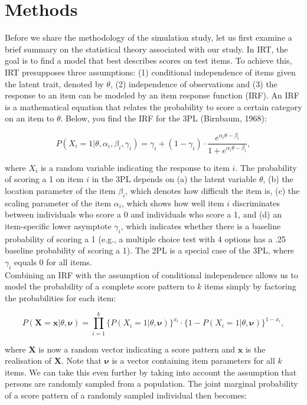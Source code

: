 \documentclass[Royal,sageapa,times,doublespace]{sagej}
\begin{document}
\section{Methods}
Before we share the methodology of the simulation study, let us first examine a brief summary on the statistical theory associated with our study. In IRT, the goal is to find a model that best describes scores on test items. To achieve this, IRT presupposes three assumptions: (1) conditional independence of items given the latent trait, denoted by $\theta$, (2) independence of observations and (3) the response to an item can be modeled by an item response function (IRF). An IRF is a mathematical equation that relates the probability to score a certain category on an item to $\theta$. Below, you find the IRF for the 3PL (Birnbaum, 1968):

\begin{equation}
P(X_i = 1 | \theta, \alpha_{i}, \beta_{i}, \gamma_{i}) = \gamma_{i} + (1 - \gamma_{i}) \cdot 
\frac{e^{\alpha_{i}\theta - \beta_{i}}}{1 + e^{\alpha_{i}\theta - \beta_{i}}},
\end{equation}

where $X_i$ is a random variable indicating the response to item $i$. The probability of scoring a 1 on item $i$ in the 3PL depends on (a) the latent variable $\theta$, (b) the location parameter of the item $\beta_{i}$, which denotes how difficult the item is, (c) the scaling parameter of the item $\alpha_{i}$, which shows how well item $i$ discriminates between individuals who score a 0 and individuals who score a 1, and (d) an item-specific lower asymptote $\gamma_{i}$, which indicates whether there is a baseline probability of scoring a 1 (e.g., a multiple choice test with 4 options has a .25 baseline probability of scoring a 1). The 2PL is a special case of the 3PL, where $\gamma_{i}$ equals 0 for all items. \\
\indent Combining an IRF with the assumption of conditional independence allows us to model the probability of a complete score pattern to $k$ items simply by factoring the probabilities for each item:

\begin{equation}
P(\boldsymbol{X} = \boldsymbol{x} | \theta, \boldsymbol{\nu}) = \prod_{i=1}^{k} \{P(X_i = 1 | \theta, \boldsymbol{\nu})\}^{x_i} \cdot  \{1 - P(X_i = 1 | \theta, \boldsymbol{\nu}) \}^{1 - x_i},
\end{equation}

where $\boldsymbol{X}$ is now a random vector indicating a score pattern and $\boldsymbol{x}$ is the realisation of $\boldsymbol{X}$. Note that $\boldsymbol{\nu}$ is a vector containing item parameters for all $k$ items. We can take this even further by taking into account the assumption that persons are randomly sampled from a population. The joint marginal probability of a score pattern of a randomly sampled individual then becomes:
\end{document}
